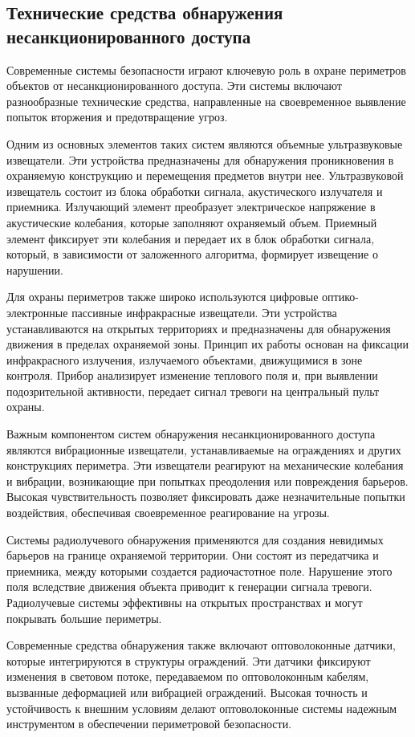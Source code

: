 \subsection{Технические средства обнаружения несанкционированного доступа}
Современные системы безопасности играют ключевую роль в охране периметров объектов от несанкционированного доступа. Эти системы включают разнообразные технические средства, направленные на своевременное выявление попыток вторжения и предотвращение угроз.

Одним из основных элементов таких систем являются объемные ультразвуковые извещатели. Эти устройства предназначены для обнаружения проникновения в охраняемую конструкцию и перемещения предметов внутри нее. Ультразвуковой извещатель состоит из блока обработки сигнала, акустического излучателя и приемника. Излучающий элемент преобразует электрическое напряжение в акустические колебания, которые заполняют охраняемый объем. Приемный элемент фиксирует эти колебания и передает их в блок обработки сигнала, который, в зависимости от заложенного алгоритма, формирует извещение о нарушении.

Для охраны периметров также широко используются цифровые оптико-электронные пассивные инфракрасные извещатели. Эти устройства устанавливаются на открытых территориях и предназначены для обнаружения движения в пределах охраняемой зоны. Принцип их работы основан на фиксации инфракрасного излучения, излучаемого объектами, движущимися в зоне контроля. Прибор анализирует изменение теплового поля и, при выявлении подозрительной активности, передает сигнал тревоги на центральный пульт охраны.

Важным компонентом систем обнаружения несанкционированного доступа являются вибрационные извещатели, устанавливаемые на ограждениях и других конструкциях периметра. Эти извещатели реагируют на механические колебания и вибрации, возникающие при попытках преодоления или повреждения барьеров. Высокая чувствительность позволяет фиксировать даже незначительные попытки воздействия, обеспечивая своевременное реагирование на угрозы.

Системы радиолучевого обнаружения применяются для создания невидимых барьеров на границе охраняемой территории. Они состоят из передатчика и приемника, между которыми создается радиочастотное поле. Нарушение этого поля вследствие движения объекта приводит к генерации сигнала тревоги. Радиолучевые системы эффективны на открытых пространствах и могут покрывать большие периметры.

Современные средства обнаружения также включают оптоволоконные датчики, которые интегрируются в структуры ограждений. Эти датчики фиксируют изменения в световом потоке, передаваемом по оптоволоконным кабелям, вызванные деформацией или вибрацией ограждений. Высокая точность и устойчивость к внешним условиям делают оптоволоконные системы надежным инструментом в обеспечении периметровой безопасности.

